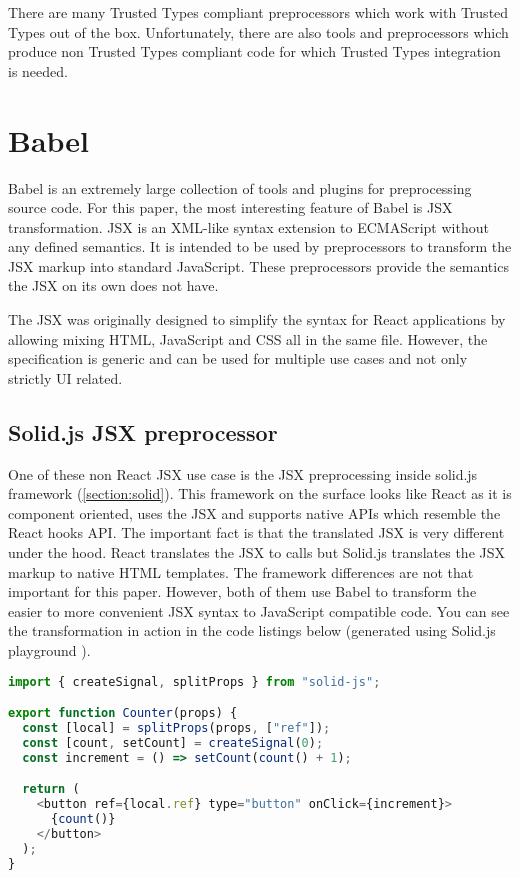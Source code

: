 There are many Trusted Types compliant preprocessors which work with Trusted Types out of the box.
Unfortunately, there are also tools and preprocessors which produce non Trusted Types compliant code
for which Trusted Types integration is needed.

\section{Babel}

Babel is an extremely large collection of tools and plugins for preprocessing source code. For this
paper, the most interesting feature of Babel is JSX transformation. JSX is an XML-like syntax
extension to ECMAScript without any defined semantics. It is intended to be used by preprocessors to
transform the JSX markup into standard JavaScript. These preprocessors provide the semantics the JSX
on its own does not have.

The JSX was originally designed to simplify the syntax for React applications by allowing mixing
HTML, JavaScript and CSS all in the same file. However, the specification \cite{jsx_spec} is
generic and can be used for multiple use cases and not only strictly UI related.

\subsection{Solid.js JSX preprocessor}
\label{jsx_solid_preprocessor}

One of these non React JSX use case is the JSX preprocessing inside solid.js framework
(\ref{section:solid}). This framework on the surface looks like React as it is component oriented,
uses the JSX and supports native APIs which resemble the React hooks API. The important fact is that
the translated JSX is very different under the hood. React translates the JSX to
 calls but Solid.js translates the JSX markup to native HTML templates.
The framework differences are not that important for this paper. However, both of them use Babel to
transform the easier to more convenient JSX syntax to JavaScript compatible code. You can see the
transformation in action in the code listings below (generated using Solid.js playground
\cite{solidjs_playground}).

\bigskip
\begin{lstlisting}[language=JavaScript, caption=Example of a component in Solid.js using JSX]
import { createSignal, splitProps } from "solid-js";

export function Counter(props) {
  const [local] = splitProps(props, ["ref"]);
  const [count, setCount] = createSignal(0);
  const increment = () => setCount(count() + 1);

  return (
    <button ref={local.ref} type="button" onClick={increment}>
      {count()}
    </button>
  );
}
\end{lstlisting}

